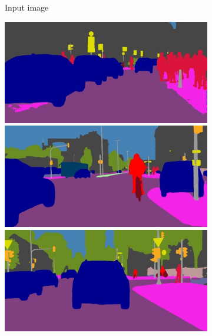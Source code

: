 \begin{figure}[t]
{\begin{subfigure}[t]{0.24\linewidth}
\begin{center}
  \caption{Input image}
\end{center}
\end{subfigure}
\begin{subfigure}[t]{0.24\linewidth}
\begin{center}
		\includegraphics[width=\linewidth,trim={0px 60px 0 0px},clip]{qualitative/bielefeld_000000_026550_semantic_segmentation_rgb.jpg}
		\includegraphics[width=\linewidth,trim={0px 60px 0 0px},clip]{qualitative/bonn_000045_000019_semantic_segmentation_rgb.jpg}
		\includegraphics[width=\linewidth,trim={0px 60px 0 0px},clip]{qualitative/munich_000021_000019_semantic_segmentation_rgb.jpg}

\end{center}
\end{subfigure}}
\end{figure}
